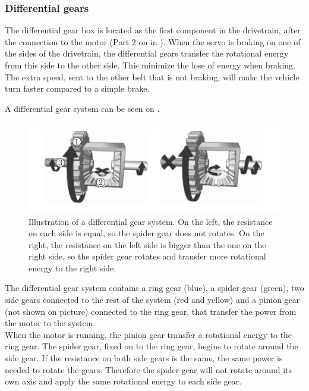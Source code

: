 \subsubsection{Differential gears} \label{sec:Differentialgears}
The differential gear box is located as the first component in the drivetrain, after the connection to the motor (Part 2 on  in ).
When the servo is braking on one of the sides of the drivetrain, the differential gears transfer the rotational energy from this side to the other side. This minimize the lose of energy when braking. The extra speed, sent to the other belt that is not braking, will make the vehicle turn faster compared to a simple brake.

A differential gear system can be seen on .

\begin{figure}[H]
	\centering
	\includegraphics[scale=0.7]{figures/diffGearLightGray}
	\caption{Illustration of a differential gear system. On the left, the resistance on each side is equal, so the spider gear does not rotates. On the right, the resistance on the left side is bigger than the one on the right side, so the spider gear rotates and transfer more rotational energy to the right side. \cite{MechanicalEngineering}}
	\label{diffGearLight}
\end{figure}

The differential gear system contains a ring gear (blue), a spider gear (green), two side gears connected to the rest of the system (red and yellow) and a pinion gear (not shown on picture) connected to the ring gear, that transfer the power from the motor to the system.\\

When the motor is running, the pinion gear transfer a rotational energy to the ring gear. The spider gear, fixed on to the ring gear, begins to rotate around the side gear. If the resistance on both side gears is the same, the same power is needed to rotate the gears. Therefore the spider gear will not rotate around its own axis and apply the same rotational energy to each side gear.\\

